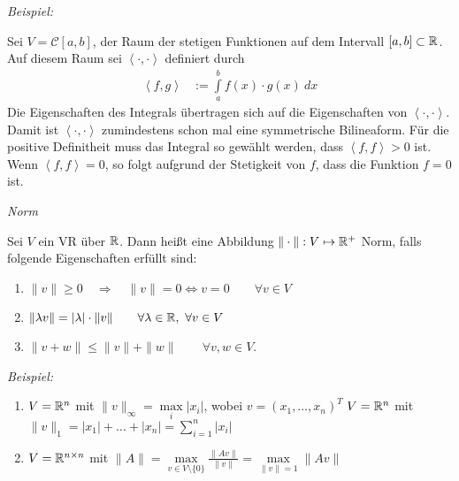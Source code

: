 \textit{Beispiel:}

Sei $V = \mathcal{C}[a,b]$, der Raum der stetigen Funktionen auf dem Intervall $[a,b] \subset \mathbb{R}$.
Auf diesem Raum sei $\left\langle \cdot , \cdot \right\rangle$ definiert durch
\begin{align*}
    \left\langle f,g \right\rangle & := \int\limits_a^b f(x) \cdot g(x) \ dx
\end{align*}
Die Eigenschaften des Integrals übertragen sich auf die Eigenschaften von $\left\langle \cdot ,  \cdot \right\rangle$.
Damit ist $\left\langle \cdot , \cdot \right\rangle$ zumindestens schon mal eine symmetrische Bilineaform.
Für die positive Definitheit muss das Integral so gewählt werden, dass $\left\langle f, f \right\rangle > 0$ ist.
Wenn $\left\langle f, f \right\rangle = 0$, so folgt aufgrund der Stetigkeit von $f$, dass die Funktion $f = 0$ ist.


\begin{mydef} \label{norm} \textit{Norm}

    Sei $V$ ein VR über $\mathbb{R}$. Dann heißt eine Abbildung $\| \cdot \|: V \mapsto \mathbb{R}^{+}$ Norm, falls folgende Eigenschaften erfüllt sind:
    \begin{enumerate}
        \item $\| v \| \geq 0 \quad \Rightarrow \quad \| v \| = 0 \Leftrightarrow v = 0 \qquad \forall v \in V$
        \item $\| \lambda v\| = |\lambda| \cdot \| v \| \qquad \forall \lambda \in \mathbb{R}, \ \forall v \in V$
        \item $\| v + w \| \leq \| v \| + \| w \| \qquad \forall v,w\in V$.
    \end{enumerate}
\end{mydef}


\textit{Beispiel:}
\begin{enumerate}
    \item   $V = \mathbb{R}^n$ mit $\| v \|_{\infty} =\max\limits_{i} | x_i |$, wobei $v = (x_1, \ldots, x_n)^T$
        $V = \mathbb{R}^n$ mit $\| v \|_{1} = | x_1| + \ldots + | x_n | = \sum\limits_{i = 1}^n | x_i |$
    \item $V = \mathbb{R}^{n \times n}$ mit $\| A \| = \max\limits_{v \in V \setminus\{ 0 \}} \frac{\| Av \|}{\| v \|} = \max\limits_{\| v\| = 1} \| Av \|$
\end{enumerate}

